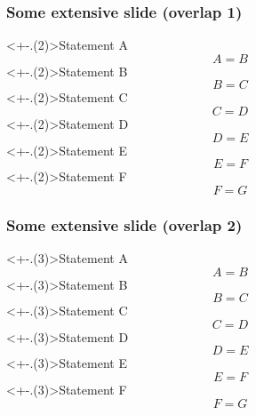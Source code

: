\documentclass{beamer}
\begin{document}
\begin{frame}[t]
\frametitle{Some extensive slide (overlap 1)}
\only<+-.(2)>{Statement A \[A=B\]}
\only<+-.(2)>{Statement B \[B=C\]}
\only<+-.(2)>{Statement C \[C=D\]}
\only<+-.(2)>{Statement D \[D=E\]}
\only<+-.(2)>{Statement E \[E=F\]}
\only<+-.(2)>{Statement F \[F=G\]}
\end{frame}

\begin{frame}[t]
\frametitle{Some extensive slide (overlap 2)}
\only<+-.(3)>{Statement A \[A=B\]}
\only<+-.(3)>{Statement B \[B=C\]}
\only<+-.(3)>{Statement C \[C=D\]}
\only<+-.(3)>{Statement D \[D=E\]}
\only<+-.(3)>{Statement E \[E=F\]}
\only<+-.(3)>{Statement F \[F=G\]}
\end{frame}
\end{document}
